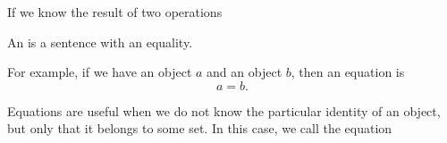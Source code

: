 
\sbasic


\sstart
{}


If we know the result of two operations


An  is a sentence
with an equality.

For example, if we have an object $a$
and an object $b$, then an equation
is
\[
  a = b.
\]

Equations are useful when we do not
know the particular identity of an
object, but only that it belongs to
some set.
In this case, we call the
equation 
\strats
